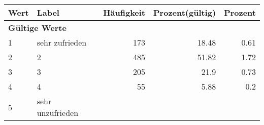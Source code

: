      \begin{longtable}{lXrrr}
     \toprule
     \textbf{Wert} & \textbf{Label} & \textbf{Häufigkeit} & \textbf{Prozent(gültig)} & \textbf{Prozent} \\
     \endhead
     \midrule
     \multicolumn{5}{l}{\textbf{Gültige Werte}}\\

     1 &
     \multicolumn{1}{X}{ sehr zufrieden   } &


       \num{173} &
       \num[round-mode=places,round-precision=2]{18.48} &
         \num[round-mode=places,round-precision=2]{0.61} \\

     2 &
     \multicolumn{1}{X}{ 2   } &


       \num{485} &
       \num[round-mode=places,round-precision=2]{51.82} &
         \num[round-mode=places,round-precision=2]{1.72} \\

     3 &
     \multicolumn{1}{X}{ 3   } &


       \num{205} &
       \num[round-mode=places,round-precision=2]{21.9} &
         \num[round-mode=places,round-precision=2]{0.73} \\

     4 &
     \multicolumn{1}{X}{ 4   } &


       \num{55} &
       \num[round-mode=places,round-precision=2]{5.88} &
         \num[round-mode=places,round-precision=2]{0.2} \\

     5 &
     \multicolumn{1}{X}{ sehr unzufrieden   } &



\end{longtable}
